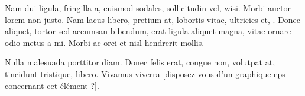 \documentclass{article}
\begin{document}

Nam dui ligula, fringilla a, euismod sodales, sollicitudin vel, wisi.
Morbi auctor lorem non justo. Nam lacus libero, pretium at, lobortis
vitae, ultricies et, . Donec aliquet, tortor sed
accumsan bibendum, erat ligula aliquet magna, vitae ornare odio metus
a mi. Morbi ac orci et nisl hendrerit mollis.

Nulla malesuada porttitor diam. Donec felis erat, congue non, volutpat
at, tincidunt tristique, libero. Vivamus viverra [disposez-vous d’un graphique eps concernant cet
élément ?].
\end{document}
